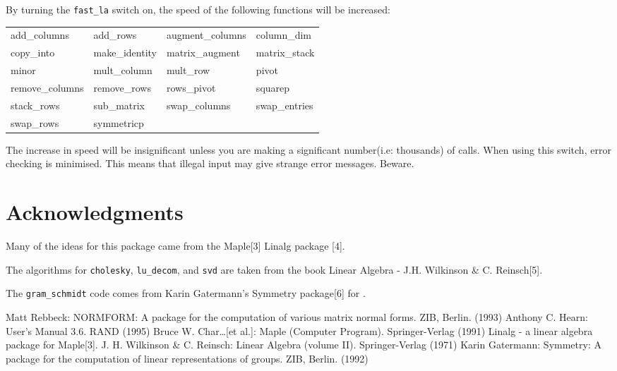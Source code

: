By turning the {\tt fast\_la} switch on, the speed of the following 
functions will be increased:

\begin{tabular}{l l l l}
   add\_columns    & add\_rows      & augment\_columns & column\_dim  \\
   copy\_into      & make\_identity & matrix\_augment  & matrix\_stack\\
   minor           & mult\_column   &  mult\_row       & pivot        \\
   remove\_columns & remove\_rows   & rows\_pivot      & squarep      \\
   stack\_rows     & sub\_matrix    & swap\_columns    & swap\_entries\\
   swap\_rows      & symmetricp                                     
\end{tabular}

The increase in speed will be insignificant unless you are making a 
significant number(i.e: thousands) of calls. When using this switch, 
error checking is minimised. This means that illegal input may give
strange error messages. Beware.

\newpage

\section{Acknowledgments}

Many of the ideas for this package came from the Maple[3] Linalg package
[4].

The algorithms for {\tt cholesky}, {\tt lu\_decom}, and {\tt svd} are 
taken from the book Linear Algebra - J.H. Wilkinson \& C. Reinsch[5].

The {\tt gram\_schmidt} code comes from Karin Gatermann's Symmetry 
package[6] for {\REDUCE}.


\begin{thebibliography}{}
 Matt Rebbeck: NORMFORM: A {\REDUCE} package for the 
computation of various matrix normal forms. ZIB, Berlin. (1993)
 Anthony C. Hearn: {\REDUCE} User's Manual 3.6.
	RAND (1995)
 Bruce W. Char\ldots [et al.]: Maple (Computer 
        Program). Springer-Verlag (1991)
 Linalg - a linear algebra package for Maple[3].
 J. H. Wilkinson \& C. Reinsch: Linear Algebra 
(volume II). Springer-Verlag (1971)
 Karin Gatermann: Symmetry: A {\REDUCE} package for the 
computation of linear representations of groups. ZIB, Berlin. (1992)
\end{thebibliography}





